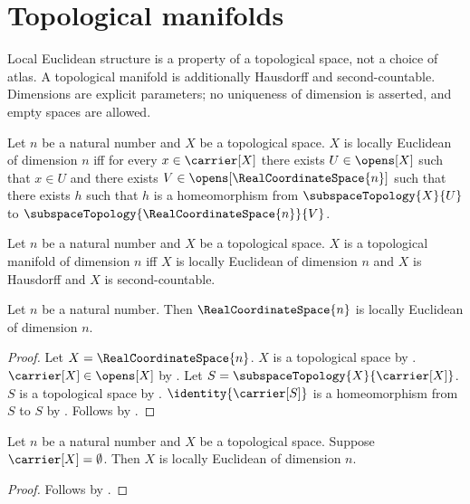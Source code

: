 \section{Topological manifolds}



Local Euclidean structure is a property of a topological space, not a choice
of atlas. A topological manifold is additionally Hausdorff and
second-countable. Dimensions are explicit parameters; no uniqueness of
dimension is asserted, and empty spaces are allowed.

\begin{definition}\label{locally_euclidean}
    Let $n$ be a natural number and $X$ be a topological space.
    $X$ is locally Euclidean of dimension $n$ iff for every $x\in\carrier[X]$
        there exists $U\in\opens[X]$ such that $x\in U$ and there exists
        $V\in\opens[\RealCoordinateSpace{n}]$ such that there exists $h$ such that
        $h$ is a homeomorphism from $\subspaceTopology{X}{U}$ to
            $\subspaceTopology{\RealCoordinateSpace{n}}{V}$.
\end{definition}

\begin{definition}\label{topological_manifold}
    Let $n$ be a natural number and $X$ be a topological space.
    $X$ is a topological manifold of dimension $n$ iff
        $X$ is locally Euclidean of dimension $n$ and
        $X$ is Hausdorff and $X$ is second-countable.
\end{definition}

\begin{theorem}\label{real_coordinate_space_is_locally_euclidean}
    Let $n$ be a natural number.
    Then $\RealCoordinateSpace{n}$ is locally Euclidean of dimension $n$.
\end{theorem}
\begin{proof}
    Let $X=\RealCoordinateSpace{n}$.
    $X$ is a topological space by .
    $\carrier[X]\in\opens[X]$ by .
    Let $S=\subspaceTopology{X}{\carrier[X]}$.
    $S$ is a topological space by .
    $\identity{\carrier[S]}$ is a homeomorphism from $S$ to $S$ by .
    Follows by .
\end{proof}

\begin{theorem}\label{empty_space_is_locally_euclidean}
    Let $n$ be a natural number and $X$ be a topological space.
    Suppose $\carrier[X]=\emptyset$.
    Then $X$ is locally Euclidean of dimension $n$.
\end{theorem}
\begin{proof}
    Follows by .
\end{proof}

